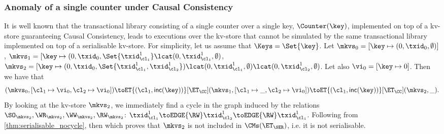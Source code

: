 \subsubsection{Anomaly of a single counter under Causal Consistency}
It is well known that the transactional library consisting of a single counter over a single 
key, $\Counter(\key)$, implemented on top of a kv-store guaranteeing Causal Consistency, 
leads to executions over the kv-store that cannot be simulated by the same transactional 
library implemented on top of a serialisable kv-store. 
For simplicity, let us assume that $\Keys = \Set{\key}$.
Let $\mkvs_{0} = [\key \mapsto (0, \txid_{0}, \emptyset)]$,  
$\mkvs_1 = [\key \mapsto (0, \txid_{0}, \Set{\txid_{\cl_1}^{1}} \lcat (0, \txid_{\cl_1}^{1}, \emptyset)$, 
$\mkvs_2 = [\key \mapsto (0, \txid_{0}, \Set{\txid_{\cl_1}^{1}, \txid_{\cl_2}^{1}}) \lcat (0, \txid_{\cl_1}^{1}, \emptyset) 
\lcat (0, \txid_{\cl_2}^{1}, \emptyset)$. Let also
$\vi_{0} = [\key \mapsto {0}]$. Then we have that 
\[
    (\mkvs_{0}, [\cl_1 \mapsto \vi_0, \cl_2 \mapsto \vi_0]) \toET{(\cl_1, \mathsf{inc(\key)})}[\ET_{\CC}]
    (\mkvs_1, [\cl_1 \mapsto \_, \cl_2 \mapsto \vi_0]) \toET{(\cl_1, \mathsf{inc(\key)})}[\ET_{\CC}]
(\mkvs_2, \_).
\]
By looking at the kv-store $\mkvs_{2}$, we immediately find a cycle in the graph induced by 
the relations $\SO_{\mkvs_{2}}, \WR_{\mkvs_{2}}, \WW_{\mkvs_{2}}, \RW_{\mkvs_{2}}$: 
$\txid_{\cl_1}^{1} \toEDGE{\RW} \txid_{\cl_2}^{1} \toEDGE{\RW} \txid_{\cl_1}^{1}$. 
Following from \cref{thm:serialisable_nocycle}, then 
which proves that $\mkvs_2$ is not included in $\CMs(\ET_{\SER})$, i.e. it is 
not serialisable.

